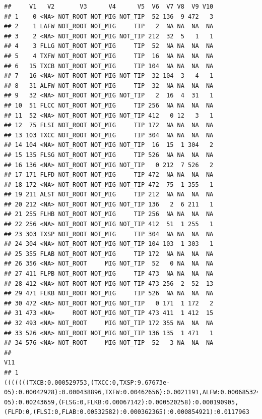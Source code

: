 \documentclass[]{article}
\begin{document}
\begin{verbatim}
##     V1   V2       V3      V4      V5  V6  V7 V8  V9 V10
## 1    0 <NA> NOT_ROOT NOT_MIG NOT_TIP  52 136  9 472   3
## 2    1 LAFW NOT_ROOT NOT_MIG     TIP   2  NA NA  NA  NA
## 3    2 <NA> NOT_ROOT NOT_MIG NOT_TIP 212  32  5   1   1
## 4    3 FLLG NOT_ROOT NOT_MIG     TIP  52  NA NA  NA  NA
## 5    4 TXFW NOT_ROOT NOT_MIG     TIP  16  NA NA  NA  NA
## 6   15 TXCB NOT_ROOT NOT_MIG     TIP 104  NA NA  NA  NA
## 7   16 <NA> NOT_ROOT NOT_MIG NOT_TIP  32 104  3   4   1
## 8   31 ALFW NOT_ROOT NOT_MIG     TIP  32  NA NA  NA  NA
## 9   32 <NA> NOT_ROOT NOT_MIG NOT_TIP   2  16  4  31   1
## 10  51 FLCC NOT_ROOT NOT_MIG     TIP 256  NA NA  NA  NA
## 11  52 <NA> NOT_ROOT NOT_MIG NOT_TIP 412   0 12   3   1
## 12  75 FLSI NOT_ROOT NOT_MIG     TIP 172  NA NA  NA  NA
## 13 103 TXCC NOT_ROOT NOT_MIG     TIP 304  NA NA  NA  NA
## 14 104 <NA> NOT_ROOT NOT_MIG NOT_TIP  16  15  1 304   2
## 15 135 FLSG NOT_ROOT NOT_MIG     TIP 526  NA NA  NA  NA
## 16 136 <NA> NOT_ROOT NOT_MIG NOT_TIP   0 212  7 526   2
## 17 171 FLFD NOT_ROOT NOT_MIG     TIP 472  NA NA  NA  NA
## 18 172 <NA> NOT_ROOT NOT_MIG NOT_TIP 472  75  1 355   1
## 19 211 ALST NOT_ROOT NOT_MIG     TIP 212  NA NA  NA  NA
## 20 212 <NA> NOT_ROOT NOT_MIG NOT_TIP 136   2  6 211   1
## 21 255 FLHB NOT_ROOT NOT_MIG     TIP 256  NA NA  NA  NA
## 22 256 <NA> NOT_ROOT NOT_MIG NOT_TIP 412  51  1 255   1
## 23 303 TXSP NOT_ROOT NOT_MIG     TIP 304  NA NA  NA  NA
## 24 304 <NA> NOT_ROOT NOT_MIG NOT_TIP 104 103  1 303   1
## 25 355 FLAB NOT_ROOT NOT_MIG     TIP 172  NA NA  NA  NA
## 26 356 <NA> NOT_ROOT     MIG NOT_TIP  52   0 NA  NA  NA
## 27 411 FLPB NOT_ROOT NOT_MIG     TIP 473  NA NA  NA  NA
## 28 412 <NA> NOT_ROOT NOT_MIG NOT_TIP 473 256  2  52  13
## 29 471 FLKB NOT_ROOT NOT_MIG     TIP 526  NA NA  NA  NA
## 30 472 <NA> NOT_ROOT NOT_MIG NOT_TIP   0 171  1 172   2
## 31 473 <NA>     ROOT NOT_MIG NOT_TIP 473 411  1 412  15
## 32 493 <NA> NOT_ROOT     MIG NOT_TIP 172 355 NA  NA  NA
## 33 526 <NA> NOT_ROOT NOT_MIG NOT_TIP 136 135  1 471   1
## 34 576 <NA> NOT_ROOT     MIG NOT_TIP  52   3 NA  NA  NA
##                                                                                                                                                                                                                                                                                                                                                                                                                V11
## 1                                                                                             (((((((TXCB:0.000529753,(TXCC:0,TXSP:9.67673e-05):0.00042928):0.000438896,TXFW:0.00462656):0.0021191,ALFW:0.000685324):0.000140543,LAFW:0.000833551):0.000556541,ALST:7.75698e-05):0.00243659,(FLSG:0,FLKB:0.00067142):0.000520258):0.000190905,(FLFD:0,(FLSI:0,FLAB:0.00532582):0.000362365):0.000854921):0.0117963

\end{verbatim}
\end{document}
